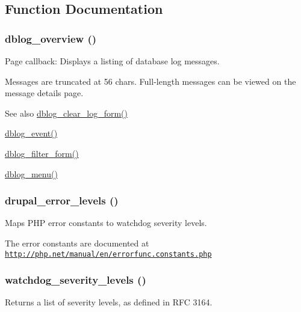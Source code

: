 \subsection{Function Documentation}
\hypertarget{group__logging__severity__levels_ga3b74d083df84c683ed01c7a5468eee12}{
\subsubsection[{dblog\_\-overview}]{\setlength{\rightskip}{0pt plus 5cm}dblog\_\-overview ()}}
\label{group__logging__severity__levels_ga3b74d083df84c683ed01c7a5468eee12}
Page callback: Displays a listing of database log messages.

Messages are truncated at 56 chars. Full-\/length messages can be viewed on the message details page.

\begin{DoxySeeAlso}{See also}
\hyperlink{group__forms_gad4ec60fb6fd40f5ae8691709f2b9affb}{dblog\_\-clear\_\-log\_\-form()} 

\hyperlink{dblog_8admin_8inc_a044370b32b7cc5cace449cb62bf6c007}{dblog\_\-event()} 

\hyperlink{group__forms_ga1baa51b833eb4a3831b4319d4c20ad19}{dblog\_\-filter\_\-form()} 

\hyperlink{dblog_8module_ac599cb2337e45bf5268f593e84039684}{dblog\_\-menu()} 
\end{DoxySeeAlso}
\hypertarget{group__logging__severity__levels_gaa3c430d607b6666eb39e5df2937f0f03}{
\subsubsection[{drupal\_\-error\_\-levels}]{\setlength{\rightskip}{0pt plus 5cm}drupal\_\-error\_\-levels ()}}
\label{group__logging__severity__levels_gaa3c430d607b6666eb39e5df2937f0f03}
Maps PHP error constants to watchdog severity levels.

The error constants are documented at \href{http://php.net/manual/en/errorfunc.constants.php}{\tt http://php.net/manual/en/errorfunc.constants.php} \hypertarget{group__logging__severity__levels_gafb5d4b58ec7e483153644c0f664e0ca4}{
\subsubsection[{watchdog\_\-severity\_\-levels}]{\setlength{\rightskip}{0pt plus 5cm}watchdog\_\-severity\_\-levels ()}}
\label{group__logging__severity__levels_gafb5d4b58ec7e483153644c0f664e0ca4}
Returns a list of severity levels, as defined in RFC 3164.

